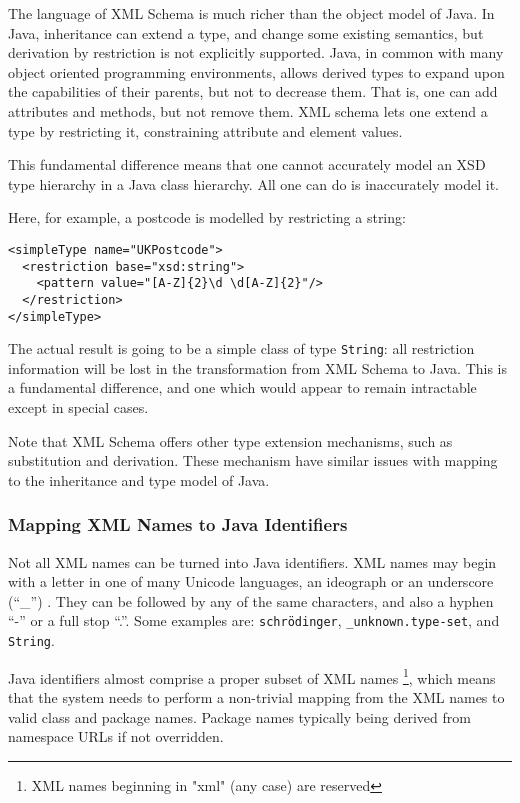The language of XML Schema is much richer than the object model of
Java. In Java, inheritance can extend a type, and change some existing
semantics, but derivation by restriction is not explicitly
supported. Java, in common with many object oriented programming
environments, allows derived types to expand upon the capabilities of
their parents, but not to decrease them. That is, one can add attributes and
methods, but not remove them. XML schema lets one extend a type by 
restricting it, constraining attribute and element values.

This fundamental difference means that one cannot accurately model an
XSD type hierarchy in a Java class hierarchy. All one can do is
inaccurately model it.

Here, for example, a postcode is modelled by restricting a string:


\begin{verbatim}
<simpleType name="UKPostcode">
  <restriction base="xsd:string">
    <pattern value="[A-Z]{2}\d \d[A-Z]{2}"/>
  </restriction>
</simpleType>
\end{verbatim}

The actual result is going to be a simple class of type {\tt String}:
all restriction information will be lost in the transformation from
XML Schema to Java. This is a fundamental difference, and one which
would appear to remain intractable except in special cases.

Note that XML Schema offers other type extension mechanisms, such as
substitution and derivation. These mechanism have similar issues with mapping
to the inheritance and type model of Java. 

\subsubsection{Mapping XML Names to Java Identifiers}
\label{objections:o-x:names}

Not all XML names can be turned into Java identifiers.  XML names may
begin with a letter in one of many Unicode languages, an ideograph or
an underscore (``\_'') . They can be followed by any of the same
characters, and also a hyphen ``-'' or a full stop ``.''. Some
examples are: {\tt schr\"odinger}, {\tt \_unknown.type-set}, and {\tt
String}.

Java identifiers almost comprise a proper subset of XML names
\footnote{XML names beginning in "xml" (any case) are reserved},
which means that the system needs to perform a non-trivial mapping
from the XML names to valid class and package names. Package names
typically being derived from namespace URLs if not overridden.

